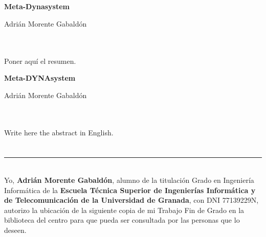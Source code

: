 \chapter*{}

\cleardoublepage
\thispagestyle{empty}

\begin{center}
	{\large\bfseries Meta-Dynasystem}\\
\end{center}
\begin{center}
	Adrián Morente Gabaldón\\
\end{center}

\\

\vspace{0.7cm}
\\

Poner aquí el resumen.

\cleardoublepage
\thispagestyle{empty}

\begin{center}
	{\large\bfseries Meta-DYNAsystem}\\
\end{center}
\begin{center}
	Adrián Morente Gabaldón\\
\end{center}

\\

\vspace{0.7cm}
\\

Write here the abstract in English.

\chapter*{}
\thispagestyle{empty}

\noindent\rule[-1ex]{\textwidth}{2pt}\\[4.5ex]

Yo, \textbf{Adrián Morente Gabaldón}, alumno de la titulación Grado en Ingeniería Informática de la \textbf{Escuela Técnica Superior
de Ingenierías Informática y de Telecomunicación de la Universidad de Granada}, con DNI 77139229N, autorizo la
ubicación de la siguiente copia de mi Trabajo Fin de Grado en la biblioteca del centro para que pueda ser
consultada por las personas que lo deseen.

